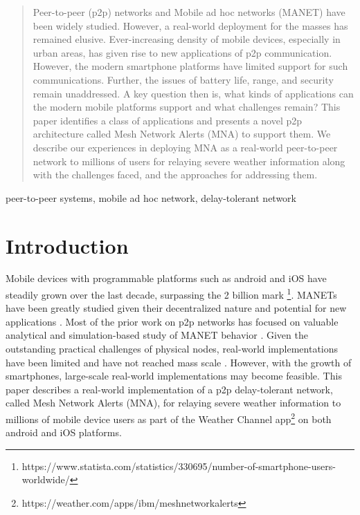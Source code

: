 \documentclass[conference]{IEEEtran}
\begin{document}
\begin{abstract}
Peer-to-peer (p2p) networks and Mobile ad hoc networks (MANET) have
been widely studied. However, a real-world deployment for the masses
has remained elusive. Ever-increasing density of mobile devices,
especially in urban areas, has given rise to new applications of p2p
communication. However, the modern smartphone platforms have limited
support for such communications. Further, the issues of battery life,
range, and security remain unaddressed. A key question then is, what
kinds of applications can the modern mobile platforms support and what
challenges remain? This paper identifies a class of applications and
presents a novel p2p architecture called Mesh Network Alerts (MNA) to
support them.  We describe our experiences in deploying MNA as a
real-world peer-to-peer network to millions of users for relaying
severe weather information along with the challenges faced, and the
approaches for addressing them.
\end{abstract}

\begin{IEEEkeywords}
peer-to-peer systems, mobile ad hoc network, delay-tolerant network
\end{IEEEkeywords}

\section{Introduction}
Mobile devices with programmable platforms such as android and iOS
have steadily grown over the last decade, surpassing the 2 billion
mark \footnote{https://www.statista.com/statistics/330695/number-of-smartphone-users-worldwide/}. MANETs
have been greatly studied given their decentralized nature and
potential for new applications
\cite{loo-manet-2011,perkins-ad-hoc-2001}. Most of the prior work on
p2p networks has focused on valuable analytical and simulation-based
study of MANET behavior
\cite{zhang-topology-manet-2015,marti-misbehavior-manet-2000,mauve-pos-routing-manet-2001}. Given
the outstanding practical challenges of physical nodes, real-world
implementations have been limited and have not reached mass scale
\cite{kiess-manet-impl-2007}. However, with the growth of smartphones,
large-scale real-world implementations may become feasible. This paper
describes a real-world implementation of a p2p delay-tolerant network,
called Mesh Network Alerts (MNA), for relaying severe weather
information to millions of mobile device users as part of the Weather
Channel app\footnote{https://weather.com/apps/ibm/meshnetworkalerts}
on both android and iOS platforms.
\end{document}
